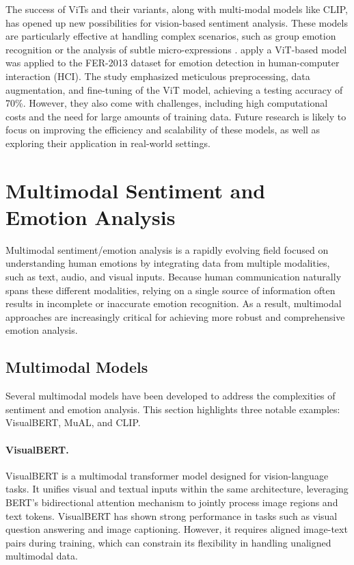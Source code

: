 The success of ViTs and their variants, along with multi-modal models like CLIP, has opened up new possibilities for vision-based sentiment analysis. These models are particularly effective at handling complex scenarios, such as group emotion recognition or the analysis of subtle micro-expressions \cite{liu2021swintransformerhierarchicalvision}. \citet{soni_vision_2024} apply a ViT-based model was applied to the FER-2013 dataset for emotion detection in human-computer interaction (HCI). The study emphasized meticulous preprocessing, data augmentation, and fine-tuning of the ViT model, achieving a testing accuracy of 70\%. However, they also come with challenges, including high computational costs and the need for large amounts of training data. Future research is likely to focus on improving the efficiency and scalability of these models, as well as exploring their application in real-world settings.


\section{Multimodal Sentiment and Emotion Analysis}
\label{sec:multimodal_analysis}

Multimodal sentiment/emotion analysis is a rapidly evolving field focused on understanding human emotions by integrating data from multiple modalities, such as text, audio, and visual inputs. Because human communication naturally spans these different modalities, relying on a single source of information often results in incomplete or inaccurate emotion recognition. As a result, multimodal approaches are increasingly critical for achieving more robust and comprehensive emotion analysis.

\subsection{Multimodal Models}

Several multimodal models have been developed to address the complexities of sentiment and emotion analysis. This section highlights three notable examples: VisualBERT, MuAL, and CLIP.

\paragraph{VisualBERT.}
VisualBERT \cite{li2019visualbertsimpleperformantbaseline} is a multimodal transformer model designed for vision-language tasks. It unifies visual and textual inputs within the same architecture, leveraging BERT's bidirectional attention mechanism to jointly process image regions and text tokens. VisualBERT has shown strong performance in tasks such as visual question answering and image captioning. However, it requires aligned image-text pairs during training, which can constrain its flexibility in handling unaligned multimodal data.

